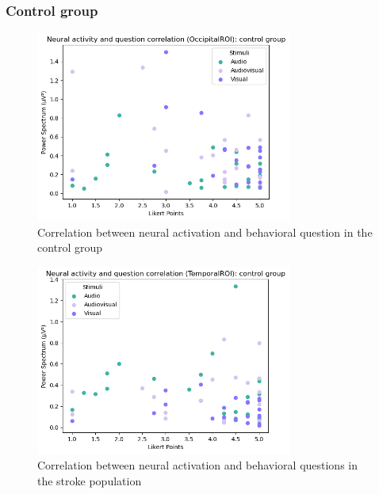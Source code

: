 \subsubsection*{Control group}
\begin{figure}[H]
    \centering
    \includegraphics[width=0.75\textwidth]{scatter_plots/h_occipital_q2.png}
    \caption{Correlation between neural activation and behavioral question in the control group}
    \label{fig: correlation q2 occipitalROI: control group} 
\end{figure}
\begin{figure}[H]
    \centering
    \includegraphics[width=0.75\textwidth]{scatter_plots/h_temporal_q2.png}
    \caption{Correlation between neural activation and behavioral questions in the stroke population}
    \label{fig: correlation q2 temporalROI: control group} 
\end{figure}
